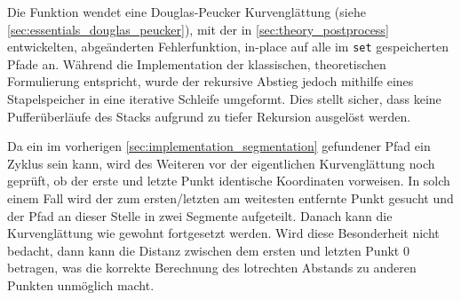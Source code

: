 Die Funktion wendet eine Douglas-Peucker Kurvenglättung (siehe \autoref{sec:essentials_douglas_peucker}), mit der in \autoref{sec:theory_postprocess} entwickelten, abgeänderten Fehlerfunktion, in-place auf alle im \texttt{set} gespeicherten Pfade an.
Während die Implementation der klassischen, theoretischen Formulierung entspricht, wurde der rekursive Abstieg jedoch mithilfe eines Stapelspeicher in eine iterative Schleife umgeformt.
Dies stellt sicher, dass keine Pufferüberläufe des Stacks aufgrund zu tiefer Rekursion ausgelöst werden.

Da ein im vorherigen \autoref{sec:implementation_segmentation} gefundener Pfad ein Zyklus sein kann, wird des Weiteren vor der eigentlichen Kurvenglättung noch geprüft, ob der erste und letzte Punkt identische Koordinaten vorweisen.
In solch einem Fall wird der zum ersten/letzten am weitesten entfernte Punkt gesucht und der Pfad an dieser Stelle in zwei Segmente aufgeteilt.
Danach kann die Kurvenglättung wie gewohnt fortgesetzt werden.
Wird diese Besonderheit nicht bedacht, dann kann die Distanz zwischen dem ersten und letzten Punkt \(0\) betragen, was die korrekte Berechnung des lotrechten Abstands zu anderen Punkten unmöglich macht.
